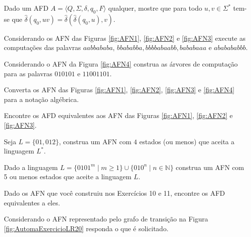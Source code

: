 \begin{problem}\label{prob:Regulares5}
	Dado um AFD $A = \langle Q, \Sigma, \delta, q_0, F\rangle$ qualquer, mostre que para todo $u,v \in \Sigma^*$ tem-se que $\widehat{\delta}(q_0, uv) = \widehat{\delta}(\widehat{\delta}(q_0, u), v)$.
\end{problem}

\begin{problem}\label{prob:Regulares6}
	Considerando os AFN das Figuras  \ref{fig:AFN1}, \ref{fig:AFN2} e \ref{fig:AFN3} execute as computações das palavras $aabbababa$, $bbababba, bbbbabaabb, bababaaa$ e $ababababbb$.
\end{problem}

\begin{problem}\label{prob:Regulares7}
	Considerando o AFN da Figura  \ref{fig:AFN4} construa as árvores de computação para as palavras $010101$ e $11001101$.
\end{problem}

\begin{problem}\label{prob:Regulares8}
	Converta os AFN das Figuras  \ref{fig:AFN1}, \ref{fig:AFN2}, \ref{fig:AFN3} e \ref{fig:AFN4} para a notação algébrica.
\end{problem}

\begin{problem}\label{prob:Regulares9}
	Encontre os AFD equivalentes aos AFN das Figuras  \ref{fig:AFN1}, \ref{fig:AFN2} e \ref{fig:AFN3}.
\end{problem}

\begin{problem}\label{prob:Regulares10}
	Seja $L = \{01, 012\}$, construa um AFN com $4$ estados (ou menos)  que aceita a linguagem $L^*$.
\end{problem}

\begin{problem}\label{prob:Regulares11}
	Dado a linguagem $L = \{0101^m \mid m \geq 1\} \cup \{010^n \mid n \in \mathbb{N}\}$ construa um AFN com 5 ou menos estados que aceite a linguagem $L$.
\end{problem}

\begin{problem}\label{prob:Regulares12}
	Dado os AFN que você construiu nos Exercícios 10 e 11, encontre os AFD equivalentes a eles.
\end{problem}

\begin{problem}\label{prob:Regulares13}
	Considerando o AFN representado pelo grafo de transição na Figura \ref{fig:AutomaExercicioLR20} responda o que é solicitado.
\end{problem}

